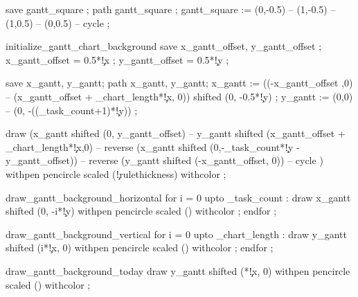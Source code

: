      save gantt_square ; path gantt_square ;
     gantt_square := (0,-0.5) -- (1,-0.5) -- (1,0.5) -- (0,0.5) -- cycle ;
   \stopMPdrawing
\stoptexdefinition

\starttexdefinition initialize_gantt_chart_background
  \startMPdrawing
      save x_gantt_offset, y_gantt_offset ;
      x_gantt_offset = 0.5*\ganttchartparameter\c!x ;
      y_gantt_offset = 0.5*\ganttchartparameter\c!y ;

      save x_gantt, y_gantt;
      path x_gantt, y_gantt;
      x_gantt := ((-x_gantt_offset ,0) -- (x_gantt_offset + \the\gantt_chart_length*\ganttchartparameter\c!x, 0))
                 shifted (0, -0.5*\ganttchartparameter\c!y) ;
      y_gantt := (0,0) -- (0, -((\gantt_task_count+1)*\ganttchartparameter\c!y)) ;

      draw (x_gantt shifted (0, y_gantt_offset) --
            y_gantt shifted (x_gantt_offset + \the\gantt_chart_length*\ganttchartparameter\c!x,0) --
            reverse (x_gantt shifted (0,-\gantt_task_count*\ganttchartparameter\c!y - y_gantt_offset)) --
            reverse (y_gantt shifted (-x_gantt_offset, 0)) -- cycle )
           withpen pencircle scaled (\ganttchartparameter\c!rulethickness) %
           withcolor  ;
 \stopMPdrawing
\stoptexdefinition

\starttexdefinition draw_gantt_background_horizontal
  \startMPdrawing
      for i = 0 upto \gantt_task_count :
          draw x_gantt shifted (0, -i*\ganttchartparameter\c!y) %
           withpen pencircle scaled () %
           withcolor  ;
      endfor ;
  \stopMPdrawing
\stoptexdefinition

\starttexdefinition draw_gantt_background_vertical
  \startMPdrawing
      for i = 0 upto \the\gantt_chart_length  :
          draw y_gantt shifted (i*\ganttchartparameter\c!x, 0) %
           withpen pencircle scaled () %
           withcolor  ;
      endfor ;
  \stopMPdrawing
\stoptexdefinition

\starttexdefinition draw_gantt_background_today
  \startMPdrawing
      draw y_gantt shifted (*\ganttchartparameter\c!x, 0) %
           withpen pencircle scaled () %
           withcolor  ;
  \stopMPdrawing
\stoptexdefinition

